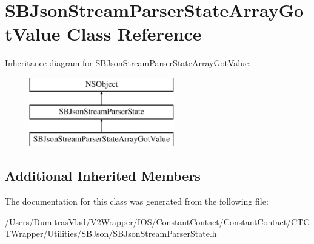 \hypertarget{interface_s_b_json_stream_parser_state_array_got_value}{\section{S\-B\-Json\-Stream\-Parser\-State\-Array\-Got\-Value Class Reference}
\label{interface_s_b_json_stream_parser_state_array_got_value}
}
Inheritance diagram for S\-B\-Json\-Stream\-Parser\-State\-Array\-Got\-Value\-:\begin{figure}[H]
\begin{center}
\leavevmode
\includegraphics[height=3.000000cm]{interface_s_b_json_stream_parser_state_array_got_value}
\end{center}
\end{figure}
\subsection*{Additional Inherited Members}


The documentation for this class was generated from the following file\-:\begin{DoxyCompactItemize}
\item 
/\-Users/\-Dumitras\-Vlad/\-V2\-Wrapper/\-I\-O\-S/\-Constant\-Contact/\-Constant\-Contact/\-C\-T\-C\-T\-Wrapper/\-Utilities/\-S\-B\-Json/S\-B\-Json\-Stream\-Parser\-State.\-h\end{DoxyCompactItemize}
